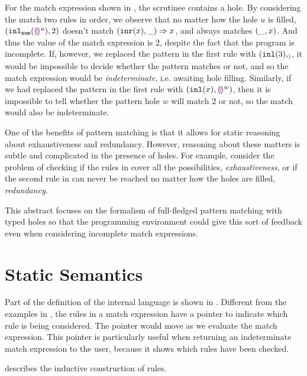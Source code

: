 \documentclass[acmsmall,screen,review,nonacm]{acmart}
\theoremstyle{slplain}
\numberwithin{thm}{section}
\begin{document}
For the match expression shown in , the scrutinee contains a hole.
By considering the match two rules in order, we observe that
no matter how the hole $u$ is filled, $(\mathtt{inl}_{\mathtt{num}}({\textcolor{violet}{\llparenthesis}\textcolor{violet}{\rrparenthesis}^{u}}) , 2)$ doesn't match $(\mathtt{inr}(x) , \_) \Rightarrow x$,
and always matches $(\_ , x)$. And thus the value of the match expression is $2$, despite the fact that the program is incomplete.
If, however, we replaced the pattern in the first rule with $(\mathtt{inl}(3), _)$, it would be impossible to decide whether the pattern matches
or not, and so the match expression would be \emph{indeterminate}, i.e. awaiting hole filling. Similarly, if we had replaced the 
pattern in the first rule with $(\mathtt{inl}(x), \textcolor{violet}{\llparenthesis}\textcolor{violet}{\rrparenthesis}^{w})$, then it is impossible to tell whether the pattern hole $w$ will match $2$ or not,
so the match would also be indeterminate.

One of the benefits of pattern matching is that it allows for static reasoning about exhaustiveness and redundancy.
However, reasoning about these matters is subtle and complicated in the presence of holes. 
For example, consider the problem of checking if the rules in  cover all the possibilities, \ie \emph{exhaustiveness}, or if the second rule in  can never be reached no matter how the holes are filled, \ie \emph{redundancy}. 

This abstract focuses on the formalism of full-fledged pattern matching with typed holes so that the programming environment could give this sort of feedback even when considering incomplete match expressions.

\section{Static Semantics}
\label{sec:statics}



Part of the definition of the internal language is shown in . 
Different from the examples in , the rules in a match expression have a pointer to indicate which rule is being considered. The pointer would move as we evaluate the match expression.
This pointer is particularly useful when returning an indeterminate match expression to the user, because it shows which rules have been checked.



 describes the inductive construction of rules. 
\end{document}
